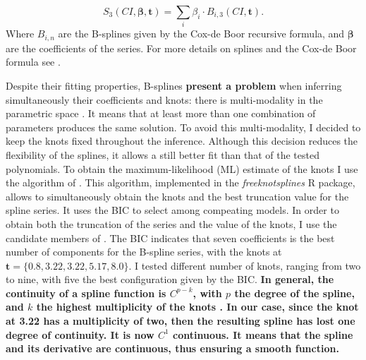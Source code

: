 \begin{equation}
S_3(CI,\boldsymbol{\beta},\mathbf{t}) = \sum_i \beta_i\cdot B_{i,3}(CI,\mathbf{t}).
\end{equation}
Where $B_{i,n}$ are the B-splines given by the Cox-de Boor recursive formula, and $\boldsymbol{\beta}$ are the coefficients of the series. For more details on splines and the Cox-de Boor formula see \citet{deBoor1978}.

Despite their fitting properties, B-splines \textbf{present a problem} when inferring simultaneously their coefficients and knots: there is multi-modality in the parametric space \citep{Lindstrom1999}. It means that at least more than one combination of parameters produces the same solution. To avoid this multi-modality, I decided to keep the knots fixed throughout the inference. Although this decision reduces the flexibility of the splines, it allows a still better fit than that of the tested polynomials. To obtain the maximum-likelihood (ML) estimate of the knots I use the algorithm of  \citet{Spiriti2013}. This algorithm, implemented in the \emph{freeknotsplines} R package, allows to simultaneously obtain the knots and the best truncation value for the spline series. It uses the BIC to select among compeating models. In order to obtain both the truncation of the series and the value of the knots, I use the candidate members of \citet{Bouy2015}. The BIC indicates that seven coefficients is the best number of components for the B-spline series, with the knots at $\mathbf{t}=\{0.8,3.22,3.22,5.17,8.0\}$. I tested different number of knots, ranging from two to nine, with five the best configuration given by the BIC. \textbf{In general, the continuity of a spline function is $C^{p-k}$, with $p$ the degree of the spline, and $k$ the highest multiplicity of the knots \citep{deBoor1978}. In our case, since the knot at 3.22 has a multiplicity of two, then the resulting spline has lost one degree of continuity. It is now $C^1$ continuous. It means that the spline and its derivative are continuous, thus ensuring a smooth function.}

